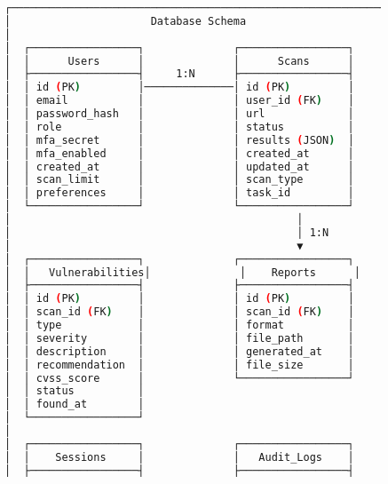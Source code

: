\documentclass[main.tex]{subfiles}
\begin{document}
\begin{figure}[h]
\centering
\begin{lstlisting}[language=bash, caption=Database Entity Relationship диаграм]
┌─────────────────────────────────────────────────────────────────┐
│                      Database Schema                            │
│                                                                 │
│  ┌─────────────────┐              ┌─────────────────┐           │
│  │      Users      │              │      Scans      │           │
│  ├─────────────────┤     1:N      ├─────────────────┤           │
│  │ id (PK)         │──────────────│ id (PK)         │           │
│  │ email           │              │ user_id (FK)    │           │
│  │ password_hash   │              │ url             │           │
│  │ role            │              │ status          │           │
│  │ mfa_secret      │              │ results (JSON)  │           │
│  │ mfa_enabled     │              │ created_at      │           │
│  │ created_at      │              │ updated_at      │           │
│  │ scan_limit      │              │ scan_type       │           │
│  │ preferences     │              │ task_id         │           │
│  └─────────────────┘              └─────────────────┘           │
│                                             │                   │
│                                             │ 1:N               │
│                                             ▼                   │
│  ┌─────────────────┐              ┌─────────────────┐           │
│  │   Vulnerabilities│              │    Reports      │           │
│  ├─────────────────┤              ├─────────────────┤           │
│  │ id (PK)         │              │ id (PK)         │           │
│  │ scan_id (FK)    │              │ scan_id (FK)    │           │
│  │ type            │              │ format          │           │
│  │ severity        │              │ file_path       │           │
│  │ description     │              │ generated_at    │           │
│  │ recommendation  │              │ file_size       │           │
│  │ cvss_score      │              └─────────────────┘           │
│  │ status          │                                            │
│  │ found_at        │                                            │
│  └─────────────────┘                                            │
│                                                                 │
│  ┌─────────────────┐              ┌─────────────────┐           │
│  │    Sessions     │              │   Audit_Logs    │           │
│  ├─────────────────┤              ├─────────────────┤           │

\end{lstlisting}
\end{figure}
\end{document}
